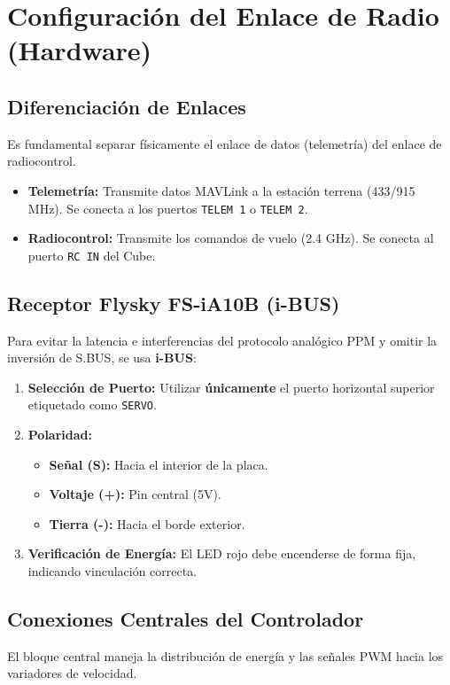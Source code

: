 \documentclass[11pt,a4paper]{article}
\begin{document}
\section{Configuración del Enlace de Radio (Hardware)}

\subsection{Diferenciación de Enlaces}
Es fundamental separar físicamente el enlace de datos (telemetría) del enlace de radiocontrol.
\begin{itemize}[leftmargin=*,noitemsep]
    \item \textbf{Telemetría:} Transmite datos MAVLink a la estación terrena (433/915 MHz). Se conecta a los puertos \texttt{TELEM 1} o \texttt{TELEM 2}.
    \item \textbf{Radiocontrol:} Transmite los comandos de vuelo (2.4 GHz). Se conecta al puerto \texttt{RC IN} del Cube.
\end{itemize}

\subsection{Receptor Flysky FS-iA10B (i-BUS)}
Para evitar la latencia e interferencias del protocolo analógico PPM y omitir la inversión de S.BUS, se usa \textbf{i-BUS}:
\begin{enumerate}[leftmargin=*,noitemsep]
    \item \textbf{Selección de Puerto:} Utilizar \textbf{únicamente} el puerto horizontal superior etiquetado como \texttt{SERVO}.
    \item \textbf{Polaridad:}
    \begin{itemize}[noitemsep]
        \item \textbf{Señal (S):} Hacia el interior de la placa.
        \item \textbf{Voltaje (+):} Pin central (5V).
        \item \textbf{Tierra (-):} Hacia el borde exterior.
    \end{itemize}
    \item \textbf{Verificación de Energía:} El LED rojo debe encenderse de forma fija, indicando vinculación correcta.
\end{enumerate}

\subsection{Conexiones Centrales del Controlador}
El bloque central maneja la distribución de energía y las señales PWM hacia los variadores de velocidad.
\end{document}
